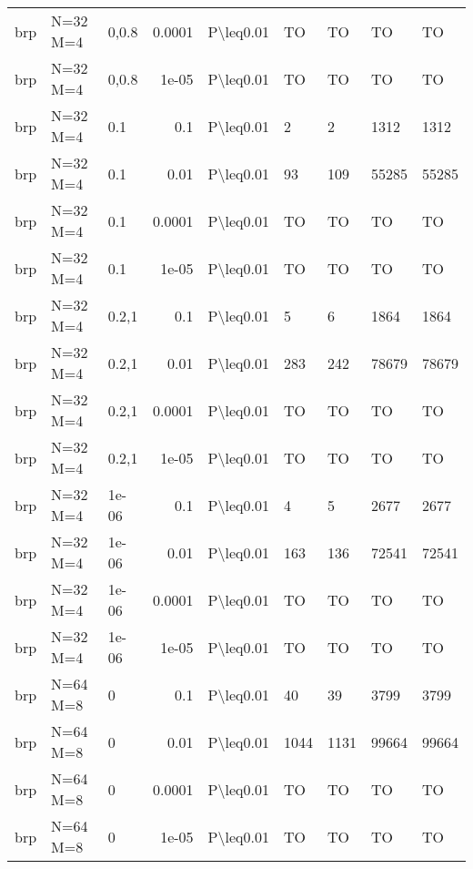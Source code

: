 \begin{longtable}{lllrlllll}
 brp           & N=32 M=4  & 0,0.8 & 0.0001 & P\textbackslash{}leq0.01  & TO   & TO   & TO       & TO      \\
 brp           & N=32 M=4  & 0,0.8 & 1e-05  & P\textbackslash{}leq0.01  & TO   & TO   & TO       & TO      \\
 brp           & N=32 M=4  & 0.1   & 0.1    & P\textbackslash{}leq0.01  & 2    & 2    & 1312     & 1312    \\
 brp           & N=32 M=4  & 0.1   & 0.01   & P\textbackslash{}leq0.01  & 93   & 109  & 55285    & 55285   \\
 brp           & N=32 M=4  & 0.1   & 0.0001 & P\textbackslash{}leq0.01  & TO   & TO   & TO       & TO      \\
 brp           & N=32 M=4  & 0.1   & 1e-05  & P\textbackslash{}leq0.01  & TO   & TO   & TO       & TO      \\
 brp           & N=32 M=4  & 0.2,1 & 0.1    & P\textbackslash{}leq0.01  & 5    & 6    & 1864     & 1864    \\
 brp           & N=32 M=4  & 0.2,1 & 0.01   & P\textbackslash{}leq0.01  & 283  & 242  & 78679    & 78679   \\
 brp           & N=32 M=4  & 0.2,1 & 0.0001 & P\textbackslash{}leq0.01  & TO   & TO   & TO       & TO      \\
 brp           & N=32 M=4  & 0.2,1 & 1e-05  & P\textbackslash{}leq0.01  & TO   & TO   & TO       & TO      \\
 brp           & N=32 M=4  & 1e-06 & 0.1    & P\textbackslash{}leq0.01  & 4    & 5    & 2677     & 2677    \\
 brp           & N=32 M=4  & 1e-06 & 0.01   & P\textbackslash{}leq0.01  & 163  & 136  & 72541    & 72541   \\
 brp           & N=32 M=4  & 1e-06 & 0.0001 & P\textbackslash{}leq0.01  & TO   & TO   & TO       & TO      \\
 brp           & N=32 M=4  & 1e-06 & 1e-05  & P\textbackslash{}leq0.01  & TO   & TO   & TO       & TO      \\
 brp           & N=64 M=8  & 0     & 0.1    & P\textbackslash{}leq0.01  & 40   & 39   & 3799     & 3799    \\
 brp           & N=64 M=8  & 0     & 0.01   & P\textbackslash{}leq0.01  & 1044 & 1131 & 99664    & 99664   \\
 brp           & N=64 M=8  & 0     & 0.0001 & P\textbackslash{}leq0.01  & TO   & TO   & TO       & TO      \\
 brp           & N=64 M=8  & 0     & 1e-05  & P\textbackslash{}leq0.01  & TO   & TO   & TO       & TO      \\

\end{longtable}
